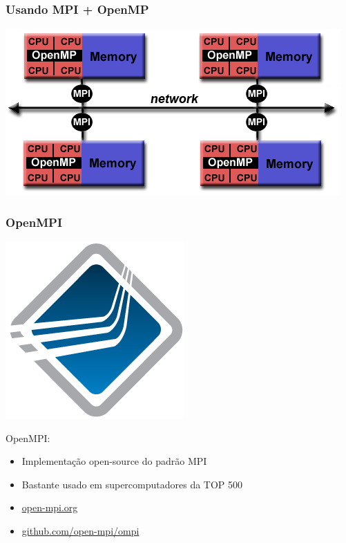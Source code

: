 \documentclass[12pt, compress]{beamer}
\begin{document}
\begin{frame}
    \frametitle{Usando MPI + OpenMP}
    \begin{center}
        \includegraphics[width=\textwidth]{hybrid-model}
    \end{center}
\end{frame}


\begin{frame}
    \frametitle{OpenMPI}
    \begin{center}
        \includegraphics[width=.3\textwidth]{open-mpi-logo}
    \end{center}

    \alert{OpenMPI}:

    \begin{itemize}
        \item Implementação \alert{open-source} do padrão MPI
        \item Bastante usado em supercomputadores da \alert{TOP 500}
        \item \url{open-mpi.org}
        \item \url{github.com/open-mpi/ompi}
    \end{itemize}
\end{frame}
\end{document}
